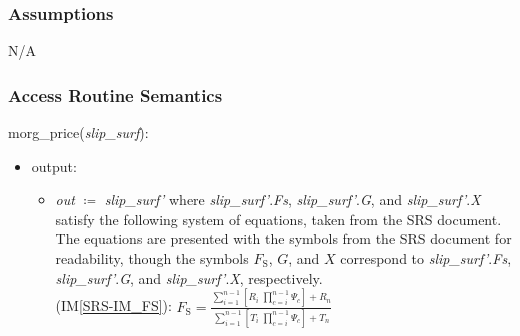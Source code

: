 \documentclass[12pt, titlepage]{article}
\newcommand{\iref}[1]{IM\ref{#1}}
\begin{document}
\subsubsection{Assumptions}
N/A
 
\subsubsection{Access Routine Semantics}
morg\_price(\textit{slip\_surf}):
\begin{itemize}
	\item output:
	\begin{itemize}
		\item[] \textit{out} $\coloneqq$ \textit{slip\_surf'} where 
		\textit{slip\_surf'}.\textit{Fs}, \textit{slip\_surf'}.\textit{G}, and 
		\textit{slip\_surf'}.\textit{X} satisfy the following system of 
		equations, taken from the SRS document. The equations are presented 
		with the symbols from the SRS document for readability, though the 
		symbols $F_\text{S}$, $G$, and $X$ correspond to 
		\textit{slip\_surf'}.\textit{Fs}, \textit{slip\_surf'}.\textit{G}, and 
		\textit{slip\_surf'}.\textit{X}, respectively.\\
		
		(\iref{SRS-IM_FS}): \( {F_\text{S}}= 
		\frac{\displaystyle\sum_{i=1}^{n-1} \left[ 
		{R_{i}}
			\;{\displaystyle\prod_{c=i}^{n-1} \Psi_{c}
			}\right] + {R_{n}} }{\displaystyle\sum_{i=1}^{n-1} \left[ {T_{i}}
			\;{\displaystyle\prod_{c=i}^{n-1} \Psi_{c}
			}\right] + {T_{n}} } \)\\
		

\end{itemize}
\end{itemize}
\end{document}
